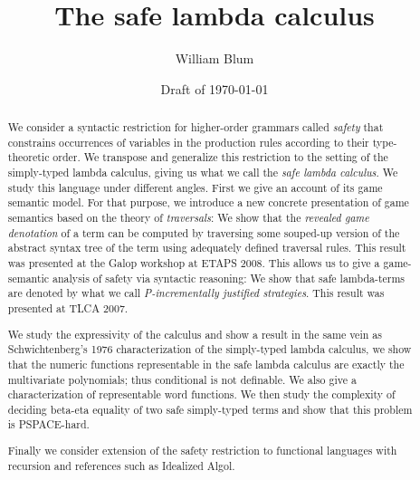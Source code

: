
\makeindex


\author{William Blum}
\title{The safe lambda calculus}
\renewcommand{\crest}{\beltcrest}

\date{Draft of \today}

\setcounter{secnumdepth}{3}
\setcounter{tocdepth}{3}


\maketitle

\begin{abstract}
We consider a syntactic restriction for higher-order grammars called \emph{safety}  that  constrains occurrences of variables in the production rules according to their type-theoretic order. We transpose and generalize this restriction to the setting of the simply-typed lambda calculus, giving us what we call the \emph{safe lambda calculus}. We study this language under different angles. First we give an account of its game semantic model. For that purpose, we introduce a new concrete presentation of game semantics based on the theory of \emph{traversals}: We show that the \emph{revealed game denotation} of a term can be computed by traversing some souped-up version of the abstract syntax tree of the term using adequately defined traversal rules. This result was presented at the Galop workshop at ETAPS 2008. This allows us to give a game-semantic analysis of safety via syntactic reasoning: We show that  safe lambda-terms are denoted by what we call \emph{P-incrementally justified strategies}. This result was presented at TLCA 2007.

We study the expressivity of the calculus and show a result in the
same vein as Schwichtenberg's 1976 characterization of the
simply-typed lambda calculus, we show that the numeric functions
representable in the safe lambda calculus are exactly the
multivariate polynomials; thus conditional is not definable. We
also give a characterization of representable word functions.
We then study the complexity of deciding beta-eta equality of two safe simply-typed terms and show that this problem is PSPACE-hard.

Finally we consider extension of the safety restriction to functional languages with recursion and references such as Idealized Algol.

\end{abstract}

